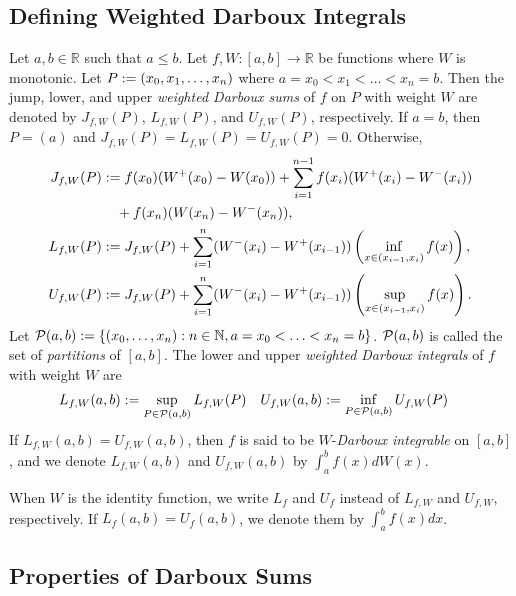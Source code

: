 \documentclass[a4paper,12pt,fleqn]{article}
\begin{document}
\subsection{Defining Weighted Darboux Integrals}

\begin{definition}
\label{defn:darboux-integral}
Let $a, b \in \mathbb{R}$ such that $a \le b$.
Let $f, W: [a, b] \to \mathbb{R}$ be functions where $W$ is monotonic.
Let $P := (x_0, x_1, \ldots, x_n)$ where $a = x_0 < x_1 < \ldots < x_n = b$.
Then the jump, lower, and upper \emph{weighted Darboux sums} of $f$ on $P$ with weight $W$
are denoted by $J_{f,W}(P)$, $L_{f,W}(P)$, and $U_{f,W}(P)$, respectively.
If $a = b$, then $P = (a)$ and $J_{f,W}(P) = L_{f,W}(P) = U_{f,W}(P) = 0$. Otherwise,
\begin{align*}
J_{f,W}(P) &:= f(x_0)(W^+(x_0) - W(x_0))
    + \sum_{i=1}^{n-1} f(x_i)(W^+(x_i) - W^-(x_i))
    \\ &\quad + f(x_n)(W(x_n) - W^-(x_n)),
\\ L_{f,W}(P) &:= J_{f,W}(P)
    + \sum_{i=1}^n (W^-(x_i) - W^+(x_{i-1}))\left(\inf_{x \in (x_{i-1}, x_i)} f(x)\right),
\\ U_{f,W}(P) &:= J_{f,W}(P)
    + \sum_{i=1}^n (W^-(x_i) - W^+(x_{i-1}))\left(\sup_{x \in (x_{i-1}, x_i)} f(x)\right).
\end{align*}
Let $\mathcal{P}(a, b) := \{(x_0, \ldots, x_n): n \in \mathbb{N}, a = x_0 < \ldots < x_n = b\}$.
$\mathcal{P}(a, b)$ is called the set of \emph{partitions} of $[a, b]$.
The lower and upper \emph{weighted Darboux integrals} of $f$ with weight $W$ are
\begin{align*}
L_{f,W}(a, b) &:= \sup_{P \in \mathcal{P}(a, b)} L_{f,W}(P)
& U_{f,W}(a, b) &:= \inf_{P \in \mathcal{P}(a, b)} U_{f,W}(P)
\end{align*}
If $L_{f,W}(a, b) = U_{f,W}(a, b)$, then $f$ is said to be
$W$-\emph{Darboux integrable} on $[a, b]$,
and we denote $L_{f,W}(a, b)$ and $U_{f,W}(a, b)$ by $\int_a^b f(x)dW(x)$.

When $W$ is the identity function, we write $L_f$ and $U_f$
instead of $L_{f,W}$ and $U_{f,W}$, respectively.
If $L_f(a, b) = U_f(a, b)$, we denote them by $\int_a^b f(x)dx$.
\end{definition}

\subsection{Properties of Darboux Sums}
\end{document}
